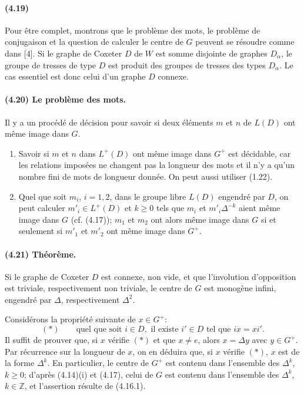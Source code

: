 \documentclass[10pt,a4paper]{article}
\newcommand{\Z}{\mathbb Z}
\begin{document}
\paragraph{(4.19)} Pour être complet, montrons que le problème des mots, le problème de conjugaison et la question de calculer le centre de \(G\) peuvent se résoudre comme dans [4]. Si le graphe de Coxeter \(D\) de \(W\) est somme disjointe de graphes \(D_\alpha\), le groupe de tresses de type \(D\) est produit des groupes de tresses des types \(D_\alpha\). Le cas essentiel est donc celui d'un graphe \(D\) connexe.

\paragraph{(4.20) Le problème des mots.} Il y a un procédé de décision pour savoir si deux éléments \(m\) et \(n\) de \(L(D)\) ont même image dans \(G\).
\begin{enumerate}[label=\alph*)]
\item Savoir si \(m\) et \(n\) dans \(L^+(D)\) ont même image dans \(G^+\) est décidable, car les relations imposées ne changent pas la longueur des mots et il n'y a qu'un nombre fini de mots de longueur donnée. On peut aussi utiliser (1.22).
\item Quel que soit \(m_i\), \(i=1,2\), dans le groupe libre \(L(D)\) engendré par \(D\), on peut calculer \(m'_i\in L^+(D)\) et \(k\ge0\) tels que \(m_i\) et \(m'_i\Delta^{-k}\) aient même image dans \(G\) (cf. (4.17)); \(m_1\) et \(m_2\) ont alors même image dans \(G\) si et seulement si \(m'_1\) et \(m'_2\) ont même image dans \(G^+\).
\end{enumerate}

\paragraph{(4.21) Théorème.} Si le graphe de Coxeter \(D\) est connexe, non vide, et que l'involution d'opposition est triviale, respectivement non triviale, le centre de \(G\) est monogène infini, engendré par \(\Delta\), respectivement \(\Delta^2\).

Considérons la propriété suivante de \(x\in G^+\):
\[
(*)\qquad
\text{quel que soit }i\in D,\text{ il existe }i'\in D\text{ tel que }ix=xi'.
\]
Il suffit de prouver que, si \(x\) vérifie \((*)\) et que \(x\ne e\), alors \(x=\Delta y\) avec \(y\in G^+\). Par récurrence sur la longueur de \(x\), on en déduira que, si \(x\) vérifie \((*)\), \(x\) est de la forme \(\Delta^k\). En particulier, le centre de \(G^+\) est contenu dans l'ensemble des \(\Delta^k\), \(k\ge0\); d'après (4.14)(i) et (4.17), celui de \(G\) est contenu dans l'ensemble des \(\Delta^k\), \(k\in\Z\), et l'assertion résulte de (4.16.1).
\end{document}
